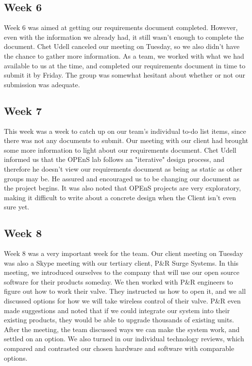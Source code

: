 \documentclass[onecolumn, draftclsnofoot,10pt, compsoc]{IEEEtran}
\begin{document}
    \subsection{Week 6}
    Week 6 was aimed at getting our requirements document completed. 
    However, even with the information we already had, it still wasn't enough to complete the document. 
    Chet Udell canceled our meeting on Tuesday, so we also didn't have the chance to gather more information.
    As a team, we worked with what we had available to us at the time, and completed our requirements document in time to submit it by Friday. 
    The group was somewhat hesitant about whether or not our submission was adequate. 
    
    \subsection{Week 7}
    This week was a week to catch up on our team's individual to-do list items, since there was not any documents to submit. 
    Our meeting with our client had brought some more information to light about our requirements document. 
    Chet Udell informed us that the OPEnS lab follows an "iterative" design process, and therefore he doesn't view our requirements document as being as static as other groups may be. 
    He assured and encouraged us to be changing our document as the project begins.
    It was also noted that OPEnS projects are very exploratory, making it difficult to write about a concrete design when the Client isn't even sure yet. 
    
    \subsection{Week 8}
    Week 8 was a very important week for the team. 
    Our client meeting on Tuesday was also a Skype meeting with our tertiary client, P\&R Surge Systems. 
    In this meeting, we introduced ourselves to the company that will use our open source software for their products someday.
    We then worked with P\&R engineers to figure out how to work their valve.
    They instructed us how to open it, and we all discussed options for how we will take wireless control of their valve. 
    P\&R even made suggestions and noted that if we could integrate our system into their existing products, they would be able to upgrade thousands of existing units. 
    After the meeting, the team discussed ways we can make the system work, and settled on an option. 
    We also turned in our individual technology reviews, which compared and contrasted our chosen hardware and software with comparable options. 
    
\end{document}
